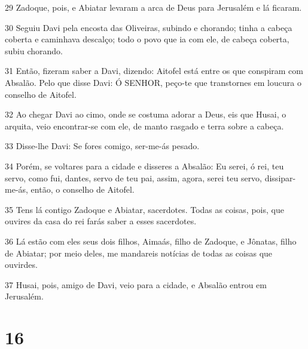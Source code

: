 \par 29 Zadoque, pois, e Abiatar levaram a arca de Deus para Jerusalém e lá ficaram.
\par 30 Seguiu Davi pela encosta das Oliveiras, subindo e chorando; tinha a cabeça coberta e caminhava descalço; todo o povo que ia com ele, de cabeça coberta, subiu chorando.
\par 31 Então, fizeram saber a Davi, dizendo: Aitofel está entre os que conspiram com Absalão. Pelo que disse Davi: Ó SENHOR, peço-te que transtornes em loucura o conselho de Aitofel.
\par 32 Ao chegar Davi ao cimo, onde se costuma adorar a Deus, eis que Husai, o arquita, veio encontrar-se com ele, de manto rasgado e terra sobre a cabeça.
\par 33 Disse-lhe Davi: Se fores comigo, ser-me-ás pesado.
\par 34 Porém, se voltares para a cidade e disseres a Absalão: Eu serei, ó rei, teu servo, como fui, dantes, servo de teu pai, assim, agora, serei teu servo, dissipar-me-ás, então, o conselho de Aitofel.
\par 35 Tens lá contigo Zadoque e Abiatar, sacerdotes. Todas as coisas, pois, que ouvires da casa do rei farás saber a esses sacerdotes.
\par 36 Lá estão com eles seus dois filhos, Aimaás, filho de Zadoque, e Jônatas, filho de Abiatar; por meio deles, me mandareis notícias de todas as coisas que ouvirdes.
\par 37 Husai, pois, amigo de Davi, veio para a cidade, e Absalão entrou em Jerusalém.

\chapter{16}

